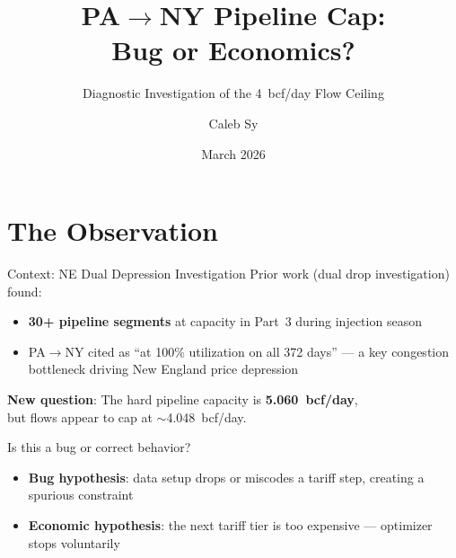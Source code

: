 \documentclass[aspectratio=169, 11pt]{beamer}
\title{PA$\to$NY Pipeline Cap:\\Bug or Economics?}
\subtitle{Diagnostic Investigation of the 4~bcf/day Flow Ceiling}
\author{Caleb Sy}
\date{March 2026}
\institute{PhD Research Briefing}
\begin{document}
\maketitle


\section{The Observation}

\begin{frame}{Context: NE Dual Depression Investigation}
  Prior work (dual drop investigation) found:
  \begin{itemize}
    \item \textbf{30+ pipeline segments} at capacity in Part~3 during injection season
    \item PA$\to$NY cited as \alert{``at 100\% utilization on all 372 days''} --- a key congestion bottleneck driving New England price depression
  \end{itemize}

  \vspace{0.5em}
  \textbf{New question}: The hard pipeline capacity is \textbf{5.060~bcf/day}, \\
  but flows appear to cap at \alert{$\sim$4.048~bcf/day}.

  \vspace{0.5em}
  \begin{block}{Is this a bug or correct behavior?}
    \begin{itemize}
      \item \textbf{Bug hypothesis}: data setup drops or miscodes a tariff step, creating a spurious constraint
      \item \textbf{Economic hypothesis}: the next tariff tier is too expensive --- optimizer stops voluntarily
    \end{itemize}
  \end{block}
\end{frame}
\end{document}
